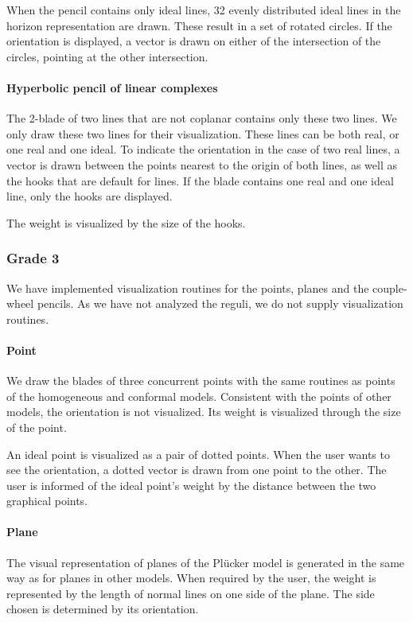 When the pencil contains only ideal lines, 32 evenly distributed ideal lines in the horizon representation are drawn.  These result in a set of rotated circles.  If the orientation is displayed, a vector is drawn on either of the intersection of the circles, pointing at the other intersection.

\paragraph{Hyperbolic pencil of linear complexes}
The 2-blade of two lines that are not coplanar contains only these two lines.  We only draw these two lines for their visualization.  These lines can be both real, or one real and one ideal.  To indicate the orientation in the case of two real lines, a vector is drawn between the points nearest to the origin of both lines, as well as the hooks that are default for lines.  If the blade contains one real and one ideal line, only the hooks are displayed.  

The weight is visualized by the size of the hooks.


\subsubsection{Grade 3}
We have implemented visualization routines for the points, planes and the couple-wheel pencils.  As we have not analyzed the reguli, we do not supply visualization routines.

\paragraph{Point} 
We draw the blades of three concurrent points with the same routines as points of the homogeneous and conformal models.  Consistent with the points of other models, the orientation is not visualized.  Its weight is visualized through the size of the point.

An ideal point is visualized as a pair of dotted points.  When the user wants to see the orientation, a dotted vector is drawn from one point to the other.  The user is informed of the ideal point's weight by the distance between the two graphical points.

\paragraph{Plane} 
The visual representation of planes of the Pl\"ucker model is generated in the same way as for planes in other models.  When required by the user, the weight is represented by the length of normal lines on one side of the plane.  The side chosen is determined by its orientation. 

